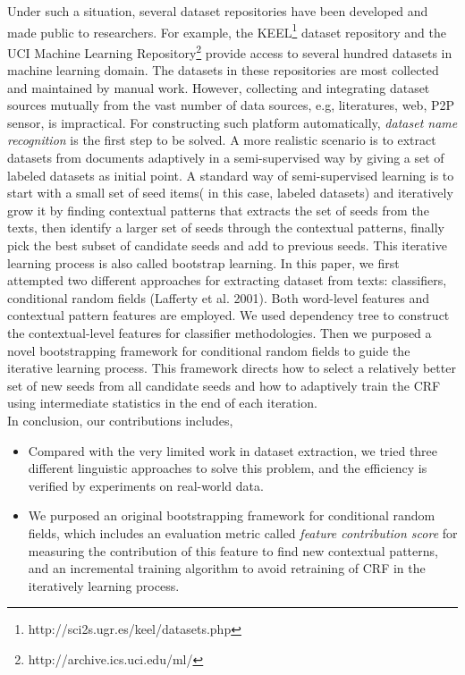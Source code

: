 \documentclass[10pt]{article}
\begin{document}
Under such a situation, several dataset repositories have been developed and made public to researchers. For example, the KEEL\footnote{http://sci2s.ugr.es/keel/datasets.php} dataset repository and the UCI Machine Learning Repository\footnote{http://archive.ics.uci.edu/ml/} provide access to several hundred datasets in machine learning domain. The datasets in these repositories are most collected and maintained by manual work. However, collecting and integrating dataset sources mutually from the vast number of data sources, e.g, literatures, web, P2P sensor, is impractical. For constructing such platform automatically, \emph{dataset name recognition} is the first step to be solved. A more realistic scenario is to extract datasets from documents adaptively in a semi-supervised way by giving a set of labeled datasets as initial point. A standard way of semi-supervised learning is to start with a small set of seed items( in this case, labeled datasets) and iteratively grow it by finding contextual patterns that extracts the set of seeds from the texts, then identify a larger set of seeds through the contextual patterns, finally pick the best subset of candidate seeds and add to previous seeds. This iterative learning process is also called bootstrap learning. In this paper, we first attempted two different approaches for extracting dataset from texts: classifiers, conditional random fields (Lafferty et al. 2001). Both word-level features and contextual pattern features are employed. We used dependency tree to construct the contextual-level features for classifier methodologies. Then we purposed a novel bootstrapping framework for conditional random fields to guide the iterative learning process. This framework directs how to select a relatively better set of new seeds from all candidate seeds and how to adaptively train the CRF using intermediate statistics in the end of each iteration. \\

In conclusion, our contributions includes,
\begin{itemize}
\item Compared with the very limited work in dataset extraction, we tried three different linguistic approaches to solve this problem, and the efficiency is verified by experiments on real-world data.
\item We purposed an original bootstrapping framework for conditional random fields, which includes an evaluation metric called \emph{feature contribution score} for measuring the contribution of this feature to find new contextual patterns, and an incremental training algorithm to avoid retraining of CRF in the iteratively learning process. 
\end{itemize}
\end{document}
